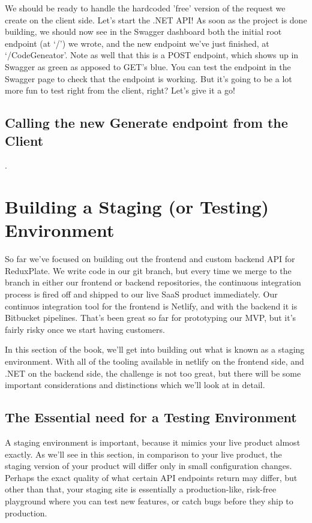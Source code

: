 \documentclass[paper=6in:9in,pagesize=pdftex,headinclude=on,footinclude=on,12pt,twoside]{scrbook}
\begin{document}
We should be ready to handle the hardcoded 'free' version of the request we create on the client side. Let's start the .NET API! As soon as the project is done building, we should now see in the Swagger dashboard both the initial root endpoint (at `/') we wrote, and the new endpoint we've just finished, at `/CodeGeneator'. Note as well that this is a POST endpoint, which shows up in Swagger as green as apposed to GET's blue. You can test the endpoint in the Swagger page to check that the endpoint is working. But it's going to be a lot more fun to test right from the client, right? Let's give it a go!

\section{Calling the new Generate endpoint from the Client}.



\chapter{Building a Staging (or Testing) Environment}

So far we've focused on building out the frontend and custom backend API for ReduxPlate. We write code in our  git branch, but every time we merge to the  branch in either our frontend or backend repositories, the continuous integration process is fired off and shipped to our live SaaS product immediately. Our continuos integration tool for the frontend is Netlify, and with the backend it is Bitbucket pipelines. That's been great so far for prototyping our MVP, but it's fairly risky once we start having customers.

In this section of the book, we'll get into building out what is known as a staging environment. With all of the tooling available in netlify on the frontend side, and .NET on the backend side, the challenge is not too great, but there will be some important considerations and distinctions which we'll look at in detail.

\section{The Essential need for a Testing Environment}

A staging environment is important, because it mimics your live product almost exactly. As we'll see in this section, in comparison to your live product, the staging version of your product will differ only in small configuration changes. Perhaps the exact quality of what certain API endpoints return may differ, but other than that, your staging site is essentially a production-like, risk-free playground where you can test new features, or catch bugs before they ship to production.
\end{document}
